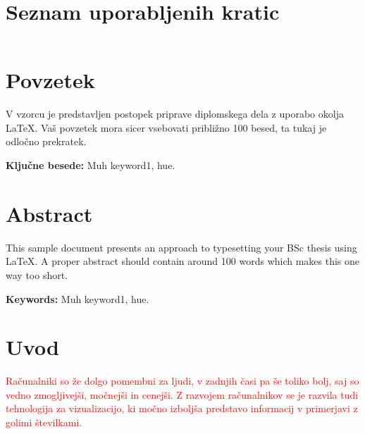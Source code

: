 \documentclass[a4paper, 12pt]{book}
\newcommand{\tkeywords}{Muh keyword1, hue}
\newcommand{\tkeywordsEn}{Muh keyword1, hue}
\newcommand{\clearemptydoublepage}{\newpage{\pagestyle{empty}\cleardoublepage}}
\begin{document}
\clearemptydoublepage


\chapter*{Seznam uporabljenih kratic}

\begin{tabular}{l|l|l}
\end{tabular}



\clearemptydoublepage

\chapter*{Povzetek}
V vzorcu je predstavljen postopek priprave diplomskega dela z uporabo okolja \LaTeX. Vaš povzetek mora sicer vsebovati približno 100 besed, ta tukaj je odločno prekratek.
\bigskip

\noindent\textbf{Ključne besede: } \tkeywords.
\clearemptydoublepage

\chapter*{Abstract}
This sample document presents an approach to typesetting your BSc thesis using \LaTeX. A proper abstract should contain around 100 words which makes this one way too short.
\bigskip

\noindent\textbf{Keywords:} \tkeywordsEn.
\clearemptydoublepage

\mainmatter
\setcounter{page}{1}
\pagestyle{fancy}

\chapter{Uvod}
\textcolor{red}{Računalniki so že dolgo pomembni za ljudi, v zadnjih časi pa še toliko bolj, saj so vedno zmogljivejši, močnejši in cenejši. Z razvojem računalnikov se je razvila tudi tehnologija za vizualizacijo, ki močno izboljša predstavo informacij v primerjavi z golimi številkami. }
\end{document}
